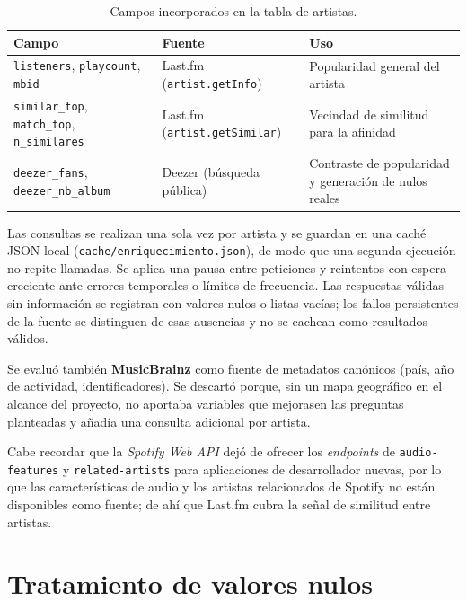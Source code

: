 \begin{table}[H]
    \centering
    \caption{Campos incorporados en la tabla de artistas.}
    \label{tab:campos-enriquecidos}
    \small
    \begin{tabular}{|p{}|p{}|p{}|}
        \hline
        \textbf{Campo} & \textbf{Fuente} & \textbf{Uso} \\
        \hline
        \texttt{listeners}, \texttt{playcount}, \texttt{mbid} & Last.fm (\texttt{artist.getInfo}) & Popularidad general del artista \\
        \hline
        \texttt{similar\_top}, \texttt{match\_top}, \texttt{n\_similares} & Last.fm (\nolinkurl{artist.getSimilar}) & Vecindad de similitud para la afinidad \\
        \hline
        \texttt{deezer\_fans}, \texttt{deezer\_nb\_album} & Deezer (búsqueda pública) & Contraste de popularidad y generación de nulos reales \\
        \hline
    \end{tabular}
\end{table}

Las consultas se realizan una sola vez por artista y se guardan en una caché JSON local (\texttt{cache/enriquecimiento.json}), de modo que una segunda ejecución no repite llamadas. Se aplica una pausa entre peticiones y reintentos con espera creciente ante errores temporales o límites de frecuencia. Las respuestas válidas sin información se registran con valores nulos o listas vacías; los fallos persistentes de la fuente se distinguen de esas ausencias y no se cachean como resultados válidos.

Se evaluó también \textbf{MusicBrainz} como fuente de metadatos canónicos (país, año de actividad, identificadores). Se descartó porque, sin un mapa geográfico en el alcance del proyecto, no aportaba variables que mejorasen las preguntas planteadas y añadía una consulta adicional por artista.

Cabe recordar que la \emph{Spotify Web API} dejó de ofrecer los \emph{endpoints} de \texttt{audio-features} y \texttt{related-artists} para aplicaciones de desarrollador nuevas, por lo que las características de audio y los artistas relacionados de Spotify no están disponibles como fuente; de ahí que Last.fm cubra la señal de similitud entre artistas.

\section{Tratamiento de valores nulos}
\label{sec:nulos}

